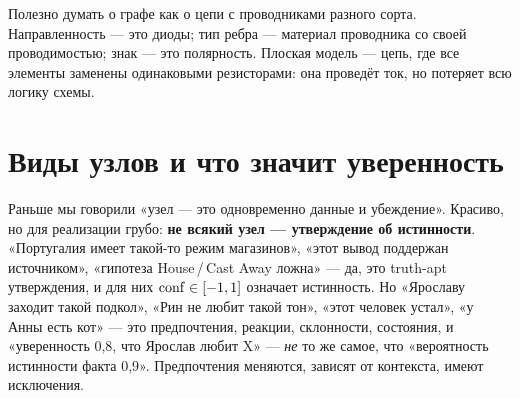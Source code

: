 \begin{intuition}
Полезно думать о графе как о цепи с проводниками разного сорта. Направленность —
это диоды; тип ребра — материал проводника со своей проводимостью; знак — это
полярность. Плоская модель — цепь, где все элементы заменены одинаковыми
резисторами: она проведёт ток, но потеряет всю логику схемы.
\end{intuition}

\begin{center}
\label{fig:cup}
\end{center}

\section{Виды узлов и что значит уверенность}
\label{sec:nodekind}

Раньше мы говорили «узел — это одновременно данные и убеждение». Красиво, но для
реализации грубо: \textbf{не всякий узел — утверждение об истинности}. «Португалия
имеет такой-то режим магазинов», «этот вывод поддержан источником», «гипотеза
House\,/\,Cast Away ложна» — да, это truth-apt утверждения, и для них
$\mathrm{conf}\in[-1,1]$ означает истинность. Но «Ярославу заходит такой подкол», «Рин не
любит такой тон», «этот человек устал», «у Анны есть кот» — это предпочтения,
реакции, склонности, состояния, и «уверенность 0,8, что Ярослав любит X» — \emph{не}
то же самое, что «вероятность истинности факта 0,9». Предпочтения меняются, зависят
от контекста, имеют исключения.

